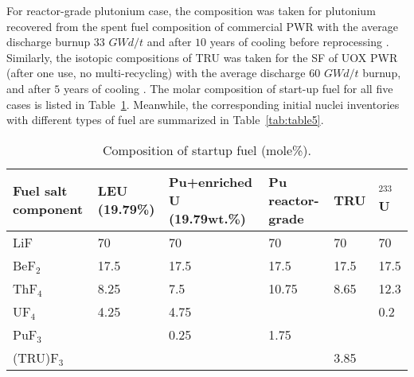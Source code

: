 For reactor-grade plutonium case, the composition was taken for plutonium 
recovered from the spent fuel composition of commercial \gls{PWR} with the 
average discharge burnup $33$ $GWd/t$ and after $10$ years of cooling before 
reprocessing \cite{oecd1989probabilistic,marka1993explosive}. Similarly, the 
isotopic compositions of \gls{TRU} was taken for the SF of UOX \gls{PWR} 
(after one use, no multi-recycling) with the average discharge $60$ 
$GWd/t$ burnup, and after $5$ years of cooling \cite{de2000scenarios}. 
The molar composition of start-up fuel for all five cases is listed in 
Table~\ref{tab:table4}. Meanwhile, the corresponding initial nuclei 
inventories with different types of fuel are summarized in 
Table~\ref{tab:table5}.
\begin{table}  %
	\caption{Composition of startup fuel (mole\%).}
	\vspace{0.1in}
	\begin{tabularx}{\textwidth}{p{} X p{} 
	p{} X X}
		\hline
		Fuel salt component& \gls{LEU} (19.79\%) & Pu+enriched U (19.79wt.\%) 
		& Pu reactor-grade & \gls{TRU}& $^{233}$U \\
		\hline
		LiF&70&70&70&70&70\\
		BeF$_2$&17.5&17.5&17.5&17.5&17.5\\
		ThF$_4$&8.25&7.5&10.75&	8.65&12.3		\\
		UF$_4$&4.25&4.75&&&	0.2		\\
		PuF$_3$&&0.25&1.75&&		\\
		(TRU)F$_3$&&&	&3.85	&\\
		\hline
	\end{tabularx}
	\label{tab:table4}
\end{table}

